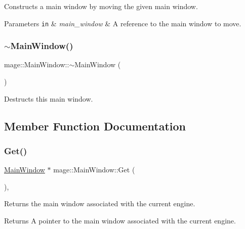 Constructs a main window by moving the given main window.


\begin{DoxyParams}[1]{Parameters}
\mbox{\tt in}  & {\em main\+\_\+window} & A reference to the main window to move. \\
\hline
\end{DoxyParams}
\hypertarget{classmage_1_1_main_window_ada7ecf97d82ce08ba2f31f0afd891031}{}\label{classmage_1_1_main_window_ada7ecf97d82ce08ba2f31f0afd891031} 
\subsubsection{\texorpdfstring{$\sim$\+Main\+Window()}{~MainWindow()}}
{\footnotesize\ttfamily mage\+::\+Main\+Window\+::$\sim$\+Main\+Window (\begin{DoxyParamCaption}{ }\end{DoxyParamCaption})}

Destructs this main window. 

\subsection{Member Function Documentation}
\hypertarget{classmage_1_1_main_window_ab670605775c88e0121afa7a52ac88ddf}{}\label{classmage_1_1_main_window_ab670605775c88e0121afa7a52ac88ddf} 
\subsubsection{\texorpdfstring{Get()}{Get()}}
{\footnotesize\ttfamily \hyperlink{classmage_1_1_main_window}{Main\+Window} $\ast$ mage\+::\+Main\+Window\+::\+Get (\begin{DoxyParamCaption}{ }\end{DoxyParamCaption})\hspace{0.3cm}{\ttfamily [static]}, {\ttfamily [noexcept]}}

Returns the main window associated with the current engine.

\begin{DoxyReturn}{Returns}
A pointer to the main window associated with the current engine. 
\end{DoxyReturn}
\hypertarget{classmage_1_1_main_window_ab4520f7c5ef0828535a117a8512221b5}{}\label{classmage_1_1_main_window_ab4520f7c5ef0828535a117a8512221b5} 
